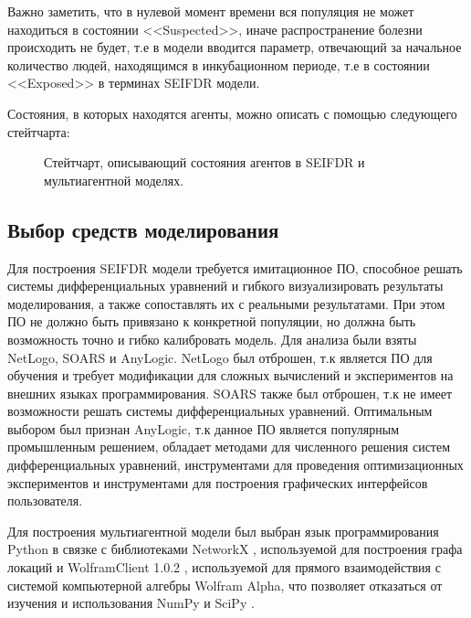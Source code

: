 Важно заметить, что в нулевой момент времени вся популяция не  может находиться в состоянии <<Suspected>>, иначе распространение болезни происходить не будет, т.е в модели вводится параметр, отвечающий за начальное количество людей, находящимся в инкубационном периоде, т.е в состоянии <<Exposed>>  в терминах SEIFDR модели.   

Состояния, в которых находятся агенты, можно описать с помощью следующего стейтчарта:
\begin{figure}
	\caption{Стейтчарт, описывающий состояния агентов в SEIFDR и мультиагентной моделях.}
\end{figure}
\subsection{Выбор средств моделирования}

Для построения SEIFDR модели требуется имитационное ПО, способное решать системы дифференциальных уравнений и гибкого визуализировать результаты моделирования, а также сопоставлять их с реальными результатами. При этом ПО не должно быть привязано к конкретной популяции, но должна быть возможность точно и гибко калибровать модель. Для анализа были взяты NetLogo, SOARS  и AnyLogic. NetLogo был отброшен, т.к является ПО для обучения и  требует модификации для сложных вычислений и экспериментов на внешних языках программирования. SOARS также был отброшен, т.к не имеет возможности решать системы дифференциальных уравнений. Оптимальным выбором был признан AnyLogic, т.к данное ПО является популярным промышленным решением, обладает методами для численного решения систем дифференциальных уравнений, инструментами для проведения оптимизационных экспериментов и инструментами для построения графических интерфейсов пользователя.


Для построения мультиагентной модели был выбран язык программирования Python в связке с библиотеками NetworkX %
\cite{NetworkX:git} , используемой для построения графа локаций 
и WolframClient 1.0.2 %
\cite{PiP:Wolfram}, используемой для прямого взаимодействия с системой компьютерной алгебры Wolfram Alpha, что позволяет отказаться от изучения и использования NumPy и SciPy %
.

